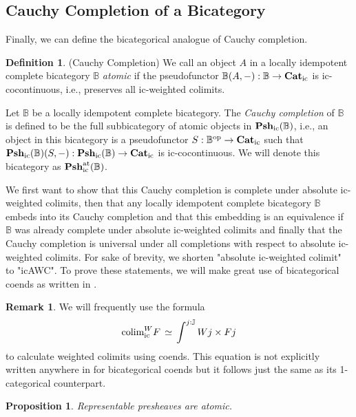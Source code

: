 \documentclass[12pt,oneside,reqno,a4paper]{article}
\newtheorem{proposition}[theorem]{Proposition}
\theoremstyle{definition}
\newtheorem{definition}[theorem]{Definition}
\newtheorem{remark}[theorem]{Remark}
\newcommand{\op}{^\textup{op}}
\newcommand{\Catic}{\textbf{\textup{Cat}}_\textup{ic}}
\newcommand{\Pshic}[1]{\textbf{\textup{Psh}}_\textup{ic}(#1)}
\newcommand{\Pshicat}[1]{\textbf{\textup{Psh}}^\textup{at}_\textup{ic}(#1)}
\renewcommand{\equiv}{\,\simeq\,}
\newcommand{\bB}{\mathbb{B}}
\newcommand{\bJ}{\mathbb{J}}
\newcommand{\colimic}{\textup{colim}_{\textup{ic}}}
\begin{document}
\subsection{Cauchy Completion of a Bicategory}

Finally, we can define the bicategorical analogue of Cauchy completion.

\begin{definition}{(Cauchy Completion)}
We call an object $A$ in a locally idempotent complete bicategory $\bB$ \textit{atomic} if the pseudofunctor $\bB(A,-):\bB\to\Catic$ is ic-cocontinuous, i.e., preserves all ic-weighted colimits.

Let $\bB$ be a locally idempotent complete bicategory. The \textit{Cauchy completion} of $\bB$ is defined to be the full subbicategory of atomic objects in $\Pshic{\bB}$, i.e., an object in this bicategory is a pseudofunctor $S:\bB\op\to\Catic$ such that $\Pshic{\bB}(S,-):\Pshic{\bB}\to\Catic$ is ic-cocontinuous. We will denote this bicategory as $\Pshicat{\bB}$.
\end{definition}

We first want to show that this Cauchy completion is complete under absolute ic-weighted colimits, then that any locally idempotent complete bicategory $\bB$ embeds into its Cauchy completion and that this embedding is an equivalence if $\bB$ was already complete under absolute ic-weighted colimits and finally that the Cauchy completion is universal under all completions with respect to absolute ic-weighted colimits. For sake of brevity, we shorten "absolute ic-weighted colimit" to "icAWC". To prove these statements, we will make great use of bicategorical coends as written in \cite[7.1]{Lor}. 

\begin{remark}
We will frequently use the formula
\begin{align*}
\colimic^W F \equiv \int^{j:\bJ} Wj \times Fj
\end{align*}
to calculate weighted colimits using coends. This equation is not explicitly written anywhere in \cite{Lor} for bicategorical coends but it follows just the same as its 1-categorical counterpart.
\end{remark}

\begin{proposition} \label{repato2}
Representable presheaves are atomic.
\end{proposition} 
\end{document}
